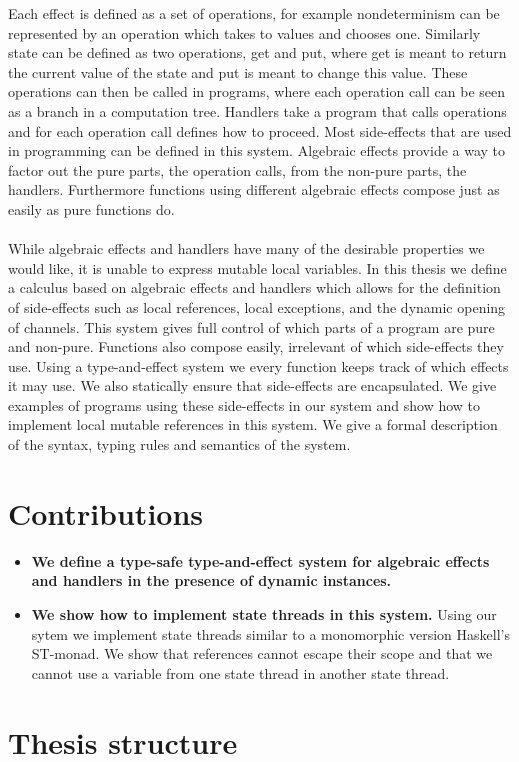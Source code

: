 Each effect is defined as a set of operations, for example nondeterminism can be represented by an operation which takes to values and chooses one.
Similarly state can be defined as two operations, get and put, where get is meant to return the current value of the state and put is meant to change this value.
These operations can then be called in programs, where each operation call can be seen as a branch in a computation tree.
Handlers take a program that calls operations and for each operation call defines how to proceed.
Most side-effects that are used in programming can be defined in this system.
Algebraic effects provide a way to factor out the pure parts, the operation calls, from the non-pure parts, the handlers.
Furthermore functions using different algebraic effects compose just as easily as pure functions do.
\\\\
While algebraic effects and handlers have many of the desirable properties we would like, it is unable to express mutable local variables.
In this thesis we define a calculus based on algebraic effects and handlers which allows for the definition of side-effects such as local references, local exceptions, and the dynamic opening of channels.
This system gives full control of which parts of a program are pure and non-pure.
Functions also compose easily, irrelevant of which side-effects they use.
Using a type-and-effect system we every function keeps track of which effects it may use.
We also statically ensure that side-effects are encapsulated.
We give examples of programs using these side-effects in our system and show how to implement local mutable references in this system.
We give a formal description of the syntax, typing rules and semantics of the system.

\section{Contributions}
\begin{itemize}

\item \textbf{We define a type-safe type-and-effect system for algebraic effects and handlers in the presence of dynamic instances.}

\item \textbf{We show how to implement state threads in this system.}
Using our sytem we implement state threads similar to a monomorphic version Haskell's ST-monad.
We show that references cannot escape their scope and that we cannot use a variable from one state thread in another state thread.

\end{itemize}

\section{Thesis structure}
